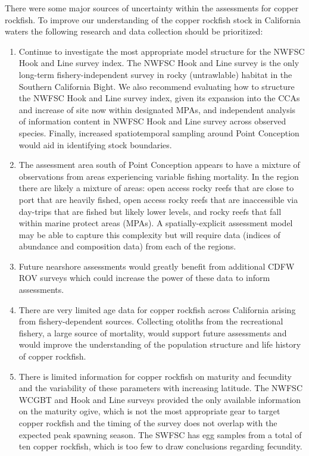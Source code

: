 \documentclass[11pt,
  english,
  letterpaper,
]{article}
\begin{document}
There were some major sources of uncertainty within the assessments for copper rockfish. To improve our understanding of the copper rockfish stock in California waters the following research and data collection should be prioritized:

\begin{enumerate}

  \item Continue to investigate the most appropriate model structure for the NWFSC Hook and Line survey index. The NWFSC Hook and Line survey is the only long-term fishery-independent survey in rocky (untrawlable) habitat in the Southern California Bight. We also recommend evaluating how to structure the NWFSC Hook and Line survey index, given its expansion into the CCAs and increase of site now within designated MPAs, and independent analysis of information content in NWFSC Hook and Line survey across observed species. Finally, increased spatiotemporal sampling around Point Conception would aid in identifying stock boundaries.

    \item The assessment area south of Point Conception appears to have a mixture of observations from areas experiencing variable fishing mortality. In the region there are likely a mixture of areas: open access rocky reefs that are close to port that are heavily fished, open access rocky reefs that are inaccessible via day-trips that are fished but likely lower levels, and rocky reefs that fall within marine protect areas (MPAs). A spatially-explicit assessment model may be able to capture this complexity but will require data (indices of abundance and composition data) from each of the regions. 
    
    \item Future nearshore assessments would greatly benefit from additional CDFW ROV surveys which could increase the power of these data to inform assessments.

    \item There are very limited age data for copper rockfish across California arising from fishery-dependent sources.  Collecting otoliths from the recreational fishery, a large source of mortality, would support future assessments and would improve the understanding of the population structure and life history of copper rockfish. 

    \item There is limited information for copper rockfish on maturity and fecundity and the variability of these parameters with increasing latitude.  The NWFSC WCGBT and Hook and Line surveys provided the only available information on the maturity ogive, which is not the most appropriate gear to target copper rockfish and the timing of the survey does not overlap with the expected peak spawning season.  The SWFSC has egg samples from a total of ten copper rockfish, which is too few to draw conclusions regarding fecundity.


\end{enumerate}
\end{document}
